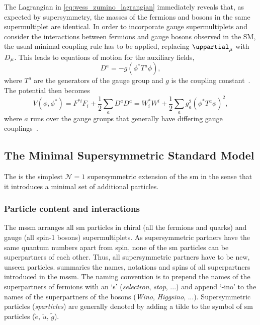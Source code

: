 The Lagrangian in \cref{eq:wess_zumino_lagrangian} immediately reveals that, as expected by supersymmetry, the masses of the fermions and bosons in the same supermultiplet are identical. In order to incorporate gauge supermultiplets and consider the interactions between fermions and gauge bosons observed in the SM, the usual minimal coupling rule has to be applied, replacing $\uppartial_\mu$ with $\mathop{}\!D_\mu$. This leads to equations of motion for the auxiliary fields,
\begin{equation}
	D^a = -g(\phi^*T^a\phi),
\end{equation}
where $T^a$ are the generators of the gauge group and $g$ is the coupling constant~\cite{Bustamante:2009us}. The potential then becomes
\begin{equation}
	V(\phi,\phi^*) = F^{*i}F_i + \frac{1}{2} \sum_a{D^aD^a} = W^*_iW^i + \frac{1}{2}\sum_a{g^2_a(\phi^*T^a\phi)^2} ,
\end{equation}
where $a$ runs over the gauge groups that generally have differing gauge couplings~\cite{Bustamante:2009us}.


 
\subsection{The Minimal Supersymmetric Standard Model}\label{sec:mssm_intro}

The  is the simplest $\mathcal{N}=1$ supersymmetric extension of the \gls{sm} in the sense that it introduces a minimal set of additional particles.

\subsubsection{Particle content and interactions}\label{sec:mssm_particle_content}

The \gls{mssm} arranges all \gls{sm} particles in chiral (all the fermions and quarks) and gauge (all spin-1 bosons) supermultiplets. As supersymmetric partners have the same quantum numbers apart from spin, none of the \gls{sm} particles can be superpartners of each other.
Thus, all supersymmetric partners have to be new, unseen particles.  summaries the names, notations and spins of all superpartners introduced in the \gls{mssm}.
The naming convention is to prepend the names of the superpartners of fermions with an `s' (\eg \textit{selectron}, \textit{stop}, ...) and append `-ino' to the names of the superpartners of the bosons (\eg \textit{Wino}, \textit{Higgsino}, ...).
Supersymmetric particles (\textit{sparticles}) are generally denoted by adding a tilde to the symbol of \gls{sm} particles (\eg $\tilde{e}$, $\tilde{u}$, $\tilde{g}$). 

